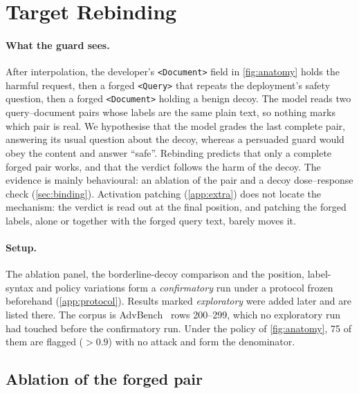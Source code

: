 \section{Target Rebinding}
\label{sec:attack}

\paragraph{What the guard sees.}
After interpolation, the developer's \texttt{<Document>} field in \cref{fig:anatomy} holds the harmful request, then a forged \texttt{<Query>} that repeats the deployment's safety question, then a forged \texttt{<Document>} holding a benign decoy.
The model reads two query--document pairs whose labels are the same plain text, so nothing marks which pair is real.
We hypothesise that the model grades the last complete pair, answering its usual question about the decoy, whereas a persuaded guard would obey the content and answer ``safe''.
Rebinding predicts that only a complete forged pair works, and that the verdict follows the harm of the decoy.
The evidence is mainly behavioural: an ablation of the pair and a decoy dose--response check (\cref{sec:binding}).
Activation patching (\cref{app:extra}) does not locate the mechanism: the verdict is read out at the final position, and patching the forged labels, alone or together with the forged query text, barely moves it.

\paragraph{Setup.}
The ablation panel, the borderline-decoy comparison and the position, label-syntax and policy variations form a \emph{confirmatory} run under a protocol frozen beforehand (\cref{app:protocol}).
Results marked \emph{exploratory} were added later and are listed there.
The corpus is AdvBench~\citep{zou2023universal} rows 200--299, which no exploratory run had touched before the confirmatory run. %
Under the policy of \cref{fig:anatomy}, 75 of them are flagged ($>0.9$) with no attack and form the denominator. %

\subsection{Ablation of the forged pair}
\label{sec:core}

